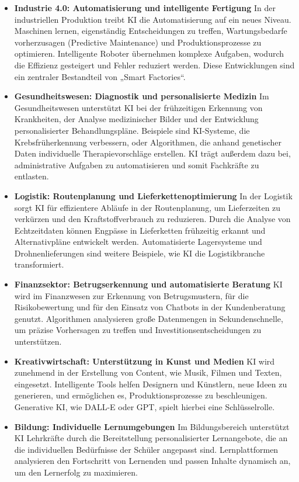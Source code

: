 \documentclass[a4paper,12pt]{article}
\begin{document}
\begin{itemize} \item \textbf{Industrie 4.0: Automatisierung und intelligente Fertigung}
In der industriellen Produktion treibt KI die Automatisierung auf ein neues Niveau. Maschinen lernen, eigenständig Entscheidungen zu treffen, Wartungsbedarfe vorherzusagen (Predictive Maintenance) und Produktionsprozesse zu optimieren. Intelligente Roboter übernehmen komplexe Aufgaben, wodurch die Effizienz gesteigert und Fehler reduziert werden. Diese Entwicklungen sind ein zentraler Bestandteil von „Smart Factories“.

\item \textbf{Gesundheitswesen: Diagnostik und personalisierte Medizin}  
Im Gesundheitswesen unterstützt KI bei der frühzeitigen Erkennung von Krankheiten, der Analyse medizinischer Bilder und der Entwicklung personalisierter Behandlungspläne. Beispiele sind KI-Systeme, die Krebsfrüherkennung verbessern, oder Algorithmen, die anhand genetischer Daten individuelle Therapievorschläge erstellen. KI trägt außerdem dazu bei, administrative Aufgaben zu automatisieren und somit Fachkräfte zu entlasten.

\item \textbf{Logistik: Routenplanung und Lieferkettenoptimierung}  
In der Logistik sorgt KI für effizientere Abläufe in der Routenplanung, um Lieferzeiten zu verkürzen und den Kraftstoffverbrauch zu reduzieren. Durch die Analyse von Echtzeitdaten können Engpässe in Lieferketten frühzeitig erkannt und Alternativpläne entwickelt werden. Automatisierte Lagersysteme und Drohnenlieferungen sind weitere Beispiele, wie KI die Logistikbranche transformiert.

\item \textbf{Finanzsektor: Betrugserkennung und automatisierte Beratung}  
KI wird im Finanzwesen zur Erkennung von Betrugsmustern, für die Risikobewertung und für den Einsatz von Chatbots in der Kundenberatung genutzt. Algorithmen analysieren große Datenmengen in Sekundenschnelle, um präzise Vorhersagen zu treffen und Investitionsentscheidungen zu unterstützen.

\item \textbf{Kreativwirtschaft: Unterstützung in Kunst und Medien}  
KI wird zunehmend in der Erstellung von Content, wie Musik, Filmen und Texten, eingesetzt. Intelligente Tools helfen Designern und Künstlern, neue Ideen zu generieren, und ermöglichen es, Produktionsprozesse zu beschleunigen. Generative KI, wie DALL-E oder GPT, spielt hierbei eine Schlüsselrolle.

\item \textbf{Bildung: Individuelle Lernumgebungen}  
Im Bildungsbereich unterstützt KI Lehrkräfte durch die Bereitstellung personalisierter Lernangebote, die an die individuellen Bedürfnisse der Schüler angepasst sind. Lernplattformen analysieren den Fortschritt von Lernenden und passen Inhalte dynamisch an, um den Lernerfolg zu maximieren.

\end{itemize}
\end{document}
